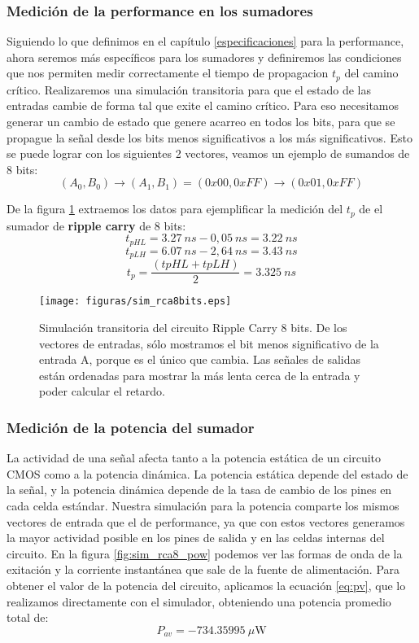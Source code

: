 \subsubsection{Medición de la performance en los sumadores}
Siguiendo lo que definimos en el capítulo \ref{especificaciones} para la performance, ahora seremos más específicos para los sumadores y definiremos las condiciones que nos permiten medir correctamente el tiempo de propagacion $t_p$ del camino crítico. Realizaremos una simulación  transitoria para que el estado de las entradas cambie de forma tal que exite el camino crítico. Para eso necesitamos generar un cambio de estado que genere acarreo en todos los bits, para que se propague la señal desde los bits menos significativos a los más significativos. Esto se puede lograr con los siguientes 2 vectores, veamos un ejemplo de sumandos de 8 bits: 
$$(A_0,B_0) \to (A_1,B_1) = (0x00, 0xFF) \to (0x01,0xFF)$$ 

De la figura \ref{fig:sim_rca8} extraemos los datos para ejemplificar la medición del $t_p$ de el sumador de \textbf{ripple carry} de 8 bits:
$$t_{pHL} = 3.27~ns - 0,05~ns = 3.22~ns$$
$$t_{pLH} = 6.07~ns - 2,64~ns = 3.43~ns$$
$$t_p = \frac{(tpHL + tpLH )}{2} = 3.325~ns$$


\begin{figure}
  \centering
\texttt{[image: figuras/sim\_rca8bits.eps]}
  \caption{Simulación transitoria del circuito Ripple Carry 8 bits. De los vectores de entradas, sólo mostramos el bit menos significativo de la entrada A, porque es el único que cambia. Las señales de salidas están ordenadas para mostrar la más lenta cerca de la entrada y poder calcular el retardo.}
\label{fig:sim_rca8}
\end{figure}
\subsubsection{Medición de la potencia del sumador}

La actividad de una señal afecta tanto a la potencia estática de un circuito CMOS como a la potencia dinámica. La potencia estática depende del estado de la señal, y la potencia dinámica depende de la tasa de cambio de los pines en cada celda estándar. Nuestra simulación para la potencia comparte los mismos vectores de entrada que el de performance, ya que con estos vectores generamos la mayor actividad posible en los pines de salida y en las celdas internas del circuito. En la figura \ref{fig:sim_rca8_pow} podemos ver las formas de onda de la exitación y la corriente instantánea que sale de la fuente de alimentación. Para obtener el valor de la potencia del circuito, aplicamos la ecuación \ref{eq:pv}, que lo realizamos directamente con el simulador, obteniendo una potencia promedio total de:
$$P_{av} = -734.35995~\mu\textrm{W}$$

